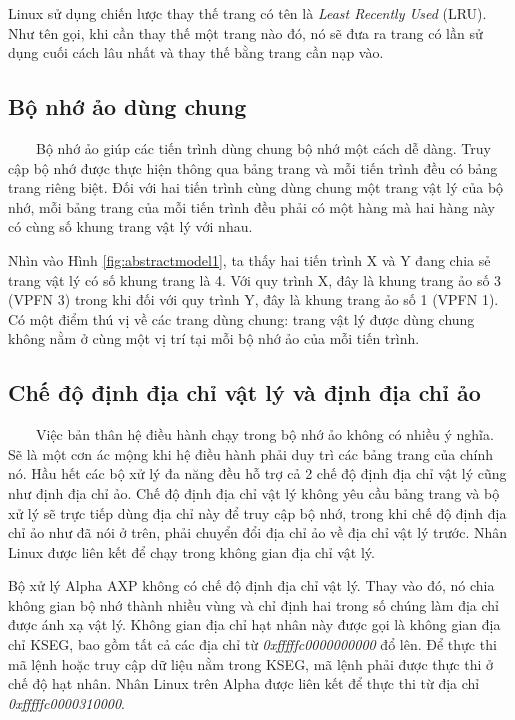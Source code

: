 \documentclass{article}
\begin{document}
Linux sử dụng chiến lược thay thế trang có tên là \textit{Least Recently Used} (LRU). Như tên gọi, khi cần thay thế một trang nào đó, nó sẽ đưa ra trang có lần sử dụng cuối cách lâu nhất và thay thế bằng trang cần nạp vào.\vspace{1em}

\subsection{Bộ nhớ ảo dùng chung}

~~~~Bộ nhớ ảo giúp các tiến trình dùng chung bộ nhớ một cách dễ dàng. Truy cập bộ nhớ được thực hiện thông qua bảng trang và mỗi tiến trình đều có bảng trang riêng biệt. Đối với hai tiến trình cùng dùng chung một trang vật lý của bộ nhớ, mỗi bảng trang của mỗi tiến trình đều phải có một hàng mà hai hàng này có cùng số khung trang vật lý với nhau.\vspace{1em}

Nhìn vào Hình \ref{fig:abstractmodel1}, ta thấy hai tiến trình X và Y đang chia sẻ trang vật lý có số khung trang là 4. Với quy trình X, đây là khung trang ảo số 3 (VPFN 3) trong khi đối với quy trình Y, đây là khung trang ảo số 1 (VPFN 1). Có một điểm thú vị về các trang dùng chung: trang vật lý được dùng chung không nằm ở cùng một vị trí tại mỗi bộ nhớ ảo của mỗi tiến trình.

\subsection{Chế độ định địa chỉ vật lý và định địa chỉ ảo}

~~~~Việc bản thân hệ điều hành chạy trong bộ nhớ ảo không có nhiều ý nghĩa. Sẽ là một cơn ác mộng khi hệ điều hành phải duy trì các bảng trang của chính nó. Hầu hết các bộ xử lý đa năng đều hỗ trợ cả 2 chế độ định địa chỉ vật lý cũng như định địa chỉ ảo. Chế độ định địa chỉ vật lý không yêu cầu bảng trang và bộ xử lý sẽ trực tiếp dùng địa chỉ này để truy cập bộ nhớ, trong khi chế độ định địa chỉ ảo như đã nói ở trên, phải chuyển đổi địa chỉ ảo về địa chỉ vật lý trước. Nhân Linux được liên kết để chạy trong không gian địa chỉ vật lý.\vspace{1em}

Bộ xử lý Alpha AXP không có chế độ định địa chỉ vật lý. Thay vào đó, nó chia không gian bộ nhớ thành nhiều vùng và chỉ định hai trong số chúng làm địa chỉ được ánh xạ vật lý. Không gian địa chỉ hạt nhân này được gọi là không gian địa chỉ KSEG, bao gồm tất cả các địa chỉ từ \textit{0xfffffc0000000000} đổ lên. Để thực thi mã lệnh hoặc truy cập dữ liệu nằm trong KSEG, mã lệnh phải được thực thi ở chế độ hạt nhân. Nhân Linux trên Alpha được liên kết để thực thi từ địa chỉ \textit{0xfffffc0000310000}.
\end{document}
